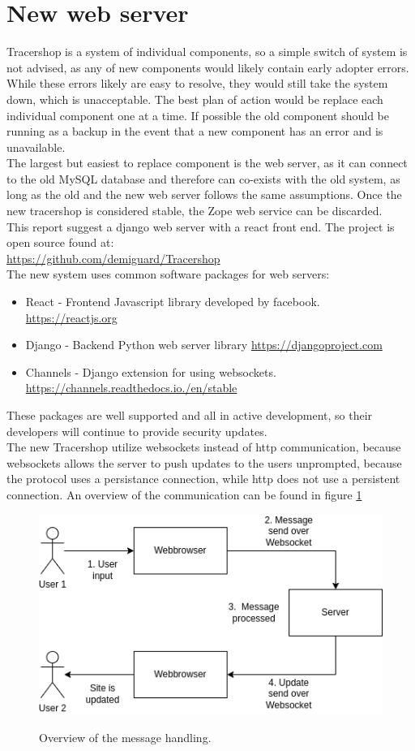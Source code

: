 \documentclass{article}
\begin{document}
\section*{New web server}
Tracershop is a system of individual components, so a simple switch of system is not advised, as any of new components would likely contain early adopter errors.
While these errors likely are easy to resolve, they would still take the system down, which is unacceptable.
The best plan of action would be replace each individual component one at a time.
If possible the old component should be running as a backup in the event that a new component has an error and is unavailable.\\
The largest but easiest to replace component is the web server, as it can connect to the old MySQL database and therefore can co-exists with the old system,
as long as the old and the new web server follows the same assumptions. Once the new tracershop is considered stable, the Zope web service can be discarded. \\
This report suggest a django web server with a react front end. The project is open source found at:\\
\url{https://github.com/demiguard/Tracershop}\\
The new system uses common software packages for web servers:
\begin{itemize}
  \item React - Frontend Javascript library developed by facebook. \url{https://reactjs.org}
  \item Django - Backend Python web server library \url{https://djangoproject.com}
  \item Channels - Django extension for using websockets. \url{https://channels.readthedocs.io./en/stable}
\end{itemize}
These packages are well supported and all in active development, so their developers will continue to provide security updates.\\
The new Tracershop utilize websockets instead of http communication, because websockets allows the server to push updates to the users unprompted,
because the protocol uses a persistance connection, while http does not use a persistent connection.
An overview of the communication can be found in figure \ref*{fig:websocketMessage}
\begin{figure}[ht]
  \begin{center}
    \includegraphics[width=0.6\linewidth]{websocketMessage.png}
    \label{fig:websocketMessage}
    \caption{Overview of the message handling.}
  \end{center}
\end{figure}
\end{document}
